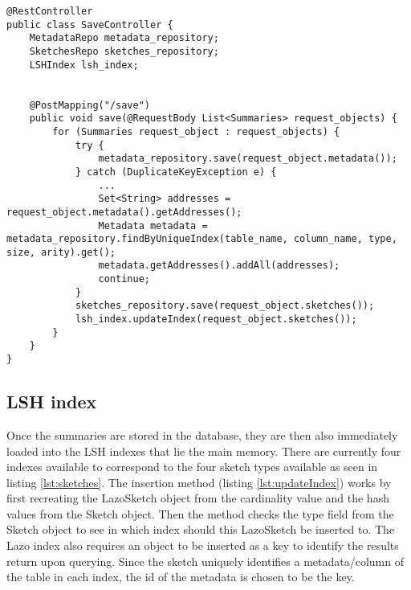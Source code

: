 \begin{lstlisting}[caption=The save controller, label=lst:saveController]
@RestController
public class SaveController {
    MetadataRepo metadata_repository;
    SketchesRepo sketches_repository;
    LSHIndex lsh_index;


    @PostMapping("/save")
    public void save(@RequestBody List<Summaries> request_objects) {
        for (Summaries request_object : request_objects) {
            try {
                metadata_repository.save(request_object.metadata());
            } catch (DuplicateKeyException e) {
                ...
                Set<String> addresses = request_object.metadata().getAddresses();
                Metadata metadata = metadata_repository.findByUniqueIndex(table_name, column_name, type, size, arity).get();
                metadata.getAddresses().addAll(addresses);
                continue;
            }
            sketches_repository.save(request_object.sketches());
            lsh_index.updateIndex(request_object.sketches());
        }
    }
}
\end{lstlisting}

\subsection{LSH index}

Once the summaries are stored in the database, they are then also immediately loaded into the LSH indexes that lie the main memory. There are currently four indexes available to correspond to the 
four sketch types available as seen in listing \ref{lst:sketches}. The insertion method (listing \ref{lst:updateIndex}) works by first recreating the LazoSketch object from the cardinality value and the hash values from the Sketch object. Then the method checks the type field from the Sketch object to see in which index should this LazoSketch be inserted to. The Lazo index also requires an object to be inserted as a key to identify the results return upon querying. Since the sketch uniquely identifies a metadata/column of the table in each index, the id of the metadata is chosen to be the key. 

